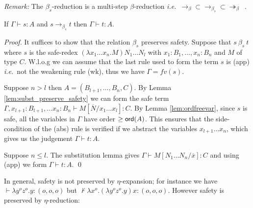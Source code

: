 \documentclass{llncs}
\newcommand\betared{\rightarrow_\beta}
\newcommand\betasred{\rightarrow_{\beta_s}}
\newcommand\betaredtr{\twoheadrightarrow_\beta} %
\newcommand\subst[2]{\left[ #1/#2 \right]}
\newcommand\ord[1]{{\sf
    ord}(#1)} \newcommand\typear{\rightarrow}
\begin{document}
\noindent \emph{Remark:} The $\beta_s$-reduction is a multi-step
$\beta$-reduction {\it i.e.}~$\betared \subset \betasred \subset
\betaredtr$\ .


\begin{lemma}
\label{lem:safered_preserve_safety}
If $\Gamma \vdash s :A$ and $s \betasred t$ then $\Gamma \vdash t :A$.
\end{lemma}

\begin{proof}
  It suffices to show that the relation $\beta_s$ preserves safety.
Suppose that $s\ \beta_s\ t$ where $s$ is the 
safe-redex $(\lambda x_1 \ldots x_n . M) N_1
  \ldots N_l $ with $x_1 : B_1, \ldots, x_n: B_n$
and $M$ of type $C$.  W.l.o.g we can assume that the last rule   used to form the term $s$ is {\sf(app)} {\it i.e.}~not the weakening rule {\sf(wk)}, thus  we have $\Gamma = fv(s)$.

Suppose $n>l$ then $A = (B_{l+1}, \ldots, B_n, C)$. By Lemma \ref{lem:subst_preserve_safety} we can form the safe term %
$\Gamma, x_{l+1}:B_{l+1}, \ldots x_n :B_{n}\vdash M\subst{\overline{N}}{x_1 \ldots x_l} : C$. %
By Lemma \ref{lem:ordfreevar}, since $s$ is safe, all the variables in $\Gamma$ have order $\geq \ord{A}$. This ensures that the side-condition of the {\sf(abs)} rule is verified if we abstract the variables $x_{l+1} \ldots x_n$, which gives us the judgement $\Gamma \vdash t :A$.

Suppose $n \leq l$. The substitution lemma gives
$\Gamma \vdash M\subst{N_1 \ldots N_n}{\overline{x}} : C$ and using {\sf(app)} we form $\Gamma \vdash t :A$.
  \qed
\end{proof}

In general, safety is not preserved by $\eta$-expansion; for instance we have
$\vdash \lambda y^o z^o . y : (o,o,o)$ but
$\not \vdash \lambda x^o . (\lambda y^o z^o . y) x : (o,o,o)$.
However safety is preserved by $\eta$-reduction:
\end{document}
